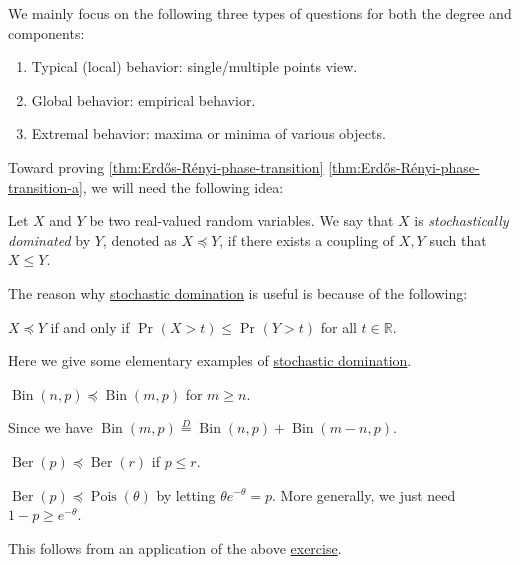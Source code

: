\begin{prev}
	We mainly focus on the following three types of questions for both the degree and components:
	\begin{enumerate}
		\item Typical (local) behavior: single/multiple points view.
		\item Global behavior: empirical behavior.
		\item Extremal behavior: maxima or minima of various objects.
	\end{enumerate}
\end{prev}

Toward proving \autoref{thm:Erdős-Rényi-phase-transition} \autoref{thm:Erdős-Rényi-phase-transition-a}, we will need the following idea:

\begin{definition}\label{def:stochastic-domination}
	Let \(X\) and \(Y\) be two real-valued random variables. We say that \(X\) is \emph{stochastically dominated} by \(Y\), denoted as \(X \preceq Y\), if there exists a coupling of \(X, Y\) such that \(X \leq Y\).
\end{definition}

The reason why \hyperref[def:stochastic-domination]{stochastic domination} is useful is because of the following:

\begin{exercise}\label{ex:stochastic-domination}
	\(X \preceq Y\) if and only if \(\Pr_{}(X > t) \leq \Pr_{}(Y > t) \) for all \(t \in \mathbb{R} \).
\end{exercise}

Here we give some elementary examples of \hyperref[def:stochastic-domination]{stochastic domination}.

\begin{eg}
	\(\operatorname{Bin}(n, p) \preceq \operatorname{Bin}(m, p) \) for \(m \geq n\).
\end{eg}
\begin{explanation}
	Since we have \(\operatorname{Bin}(m, p) \overset{D}{=} \operatorname{Bin}(n, p) + \operatorname{Bin}(m - n, p)\).
\end{explanation}

\begin{eg}
	\(\operatorname{Ber}(p) \preceq \operatorname{Ber}(r) \) if \(p \leq r\).
\end{eg}

\begin{eg}
	\(\operatorname{Ber}(p) \preceq \operatorname{Pois}(\theta ) \) by letting \(\theta e^{-\theta } = p\). More generally, we just need \(1 - p \geq e^{-\theta }\).
\end{eg}
\begin{explanation}
	This follows from an application of the above \hyperref[ex:stochastic-domination]{exercise}.
\end{explanation}

